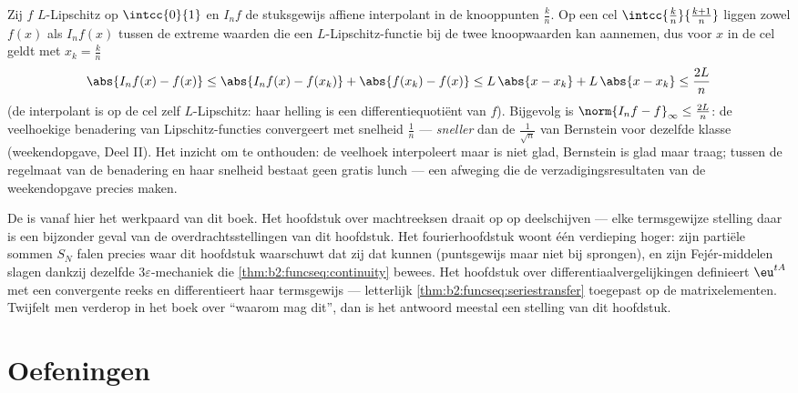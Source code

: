 \begin{example}\label{ex:b2:funcseq:polygonal}
Zij $f$ $L$-Lipschitz op $\intcc{0}{1}$ en $I_nf$ de stuksgewijs
affiene interpolant in de knooppunten $\frac kn$. Op een cel
$\intcc{\frac kn}{\frac{k+1}n}$ liggen zowel $f(x)$ als $I_nf(x)$
tussen de extreme waarden die een $L$-Lipschitz-functie bij de twee
knoopwaarden kan aannemen, dus voor $x$ in de cel geldt met $x_k =
\frac kn$
\[
\abs{I_nf(x) - f(x)}
\leq \abs{I_nf(x) - f(x_k)} + \abs{f(x_k) - f(x)}
\leq L\,\abs{x - x_k} + L\,\abs{x - x_k}
\leq \frac{2L}{n}
\]
(de interpolant is op de cel zelf $L$-Lipschitz: haar helling is
een differentiequotiënt van $f$). Bijgevolg is $\norm{I_nf -
f}_\infty \leq \frac{2L}{n}$: de veelhoekige benadering van
Lipschitz-functies convergeert met snelheid $\frac1n$ ---
\emph{sneller} dan de $\frac{1}{\sqrt n}$ van Bernstein voor
dezelfde klasse (weekendopgave, Deel II). Het inzicht om te
onthouden: de veelhoek interpoleert maar is niet glad, Bernstein is
glad maar traag; tussen de regelmaat van de benadering en haar
snelheid bestaat geen gratis lunch --- een afweging die de
verzadigingsresultaten van de weekendopgave precies maken.
\end{example}

\begin{remark}
De  is vanaf hier het werkpaard van dit boek.
Het hoofdstuk over machtreeksen draait  op  op  deelschijven --- elke termsgewijze
stelling daar is een bijzonder geval van de overdrachtsstellingen
van dit hoofdstuk. Het fourierhoofdstuk woont één verdieping hoger:
zijn partiële sommen $S_N$ falen precies waar dit hoofdstuk
waarschuwt dat zij dat kunnen (puntsgewijs maar niet  bij
sprongen), en zijn Fejér-middelen slagen dankzij dezelfde
$3\varepsilon$-mechaniek die \cref{thm:b2:funcseq:continuity}
bewees. Het hoofdstuk over differentiaalvergelijkingen definieert
$\eu^{tA}$ met een  convergente reeks en differentieert haar
termsgewijs --- letterlijk
\cref{thm:b2:funcseq:seriestransfer} toegepast op de
matrixelementen. Twijfelt men verderop in het boek over ``waarom
mag dit'', dan is het antwoord meestal een stelling van dit
hoofdstuk.
\end{remark}

\section{Oefeningen}

